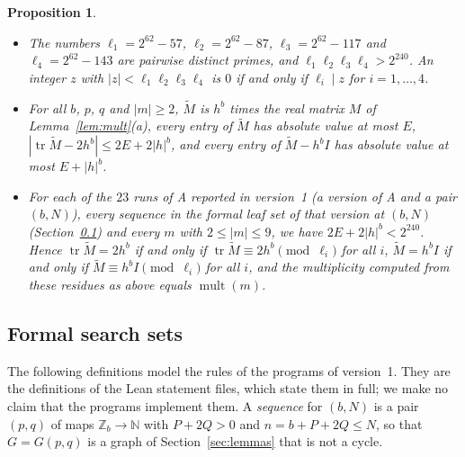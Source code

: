 \documentclass[11pt]{article}
\newtheorem{proposition}[lemma]{Proposition}
\theoremstyle{definition}
\theoremstyle{remark}
\DeclareMathOperator{\mult}{mult}
\DeclareMathOperator{\tr}{tr}
\newcommand{\Z}{\mathbb Z}
\begin{document}
\begin{proposition}\label{prop:crt}
\begin{itemize}
\item[(a)] The numbers $\ell_1=2^{62}-57$, $\ell_2=2^{62}-87$,
 $\ell_3=2^{62}-117$ and $\ell_4=2^{62}-143$ are pairwise distinct primes, and
 $\ell_1\ell_2\ell_3\ell_4>2^{240}$. An integer $z$ with
 $|z|<\ell_1\ell_2\ell_3\ell_4$ is $0$ if and only if $\ell_i\mid z$ for
 $i=1,\dots,4$.
\item[(b)] For all $b$, $p$, $q$ and $|m|\ge2$, $\tilde M$ is $h^b$ times the real
 matrix $M$ of Lemma~\ref{lem:mult}(a), every entry of $\tilde M$ has absolute
 value at most $E$, $|\tr\tilde M-2h^b|\le2E+2|h|^b$, and every entry of
 $\tilde M-h^bI$ has absolute value at most $E+|h|^b$.
\item[(c)] For each of the $23$ runs of A reported in version~1 (a version of A
 and a pair $(b,N)$), every sequence in the formal leaf set of that version at
 $(b,N)$ (Section~\ref{sec:sets}) and every $m$ with $2\le|m|\le9$, we have
 $2E+2|h|^b<2^{240}$. Hence $\tr\tilde M=2h^b$ if and only if
 $\tr\tilde M\equiv2h^b\pmod{\ell_i}$ for all $i$, $\tilde M=h^bI$ if and only if
 $\tilde M\equiv h^bI\pmod{\ell_i}$ for all $i$, and the multiplicity computed
 from these residues as above equals $\mult(m)$.
\end{itemize}
\end{proposition}

\subsection{Formal search sets}\label{sec:sets}
The following definitions model the rules of the programs of version~1. They
are the definitions of the Lean statement files, which state them in full; we
make no claim that the programs implement them. A \emph{sequence} for $(b,N)$
is a pair $(p,q)$ of maps $\Z_b\to\mathbb N$ with $P+2Q>0$ and
$n=b+P+2Q\le N$, so that $G=G(p,q)$ is a graph of Section~\ref{sec:lemmas} that
is not a cycle.
\end{document}
